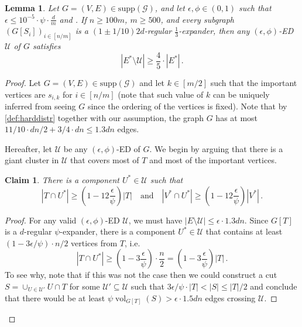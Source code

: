 \documentclass[epsfig,letter,11pt]{article}
\numberwithin{equation}{section}
\DeclareMathOperator{\vol}{vol}
\newcommand*{\supp}{\mathrm{supp}}
\newtheorem{lemma}[theorem]{Lemma}
\newtheorem{claim}[theorem]{Claim}
\begin{document}
\begin{lemma} \label{lem:special-edge}
	Let $G=(V,E) \in \supp(\mathcal{G})$, and let $\epsilon,\phi \in (0,1)$ such that $\epsilon \le 10^{-5} \cdot \psi \cdot \frac{d}{m}$ and . If $n \ge 100 m$, $m\ge 500$, and every subgraph $(G[S_i])_{i \in [n/m]}$ is a $(1 \pm 1/10)2d$-regular $\frac{1}{3}$-expander, then any $(\epsilon,\phi)$-ED~$\mathcal{U}$ of $G$ satisfies
	\begin{equation*}
		\left| E^* \setminus \mathcal{U}\right| \ge \frac{4}{5} \cdot \left| E^*\right| \, .
	\end{equation*}
\end{lemma}

\begin{proof} 
	Let $G=(V,E) \in \supp(\mathcal{G})$ and let $k \in [m/2]$ such that the important vertices are $s_{i,k}$ for $i \in [n/m]$ (note that such value of $k$ can be uniquely inferred from seeing $G$ since the ordering of the vertices is fixed). Note that by \cref{def:harddistr} together with our assumption, the graph $G$ has at most $11/10\cdot dn/2+3/4 \cdot dn \le 1.3 dn$ edges.
	
	Hereafter, let $\mathcal{U}$ be any $(\epsilon,\phi)$-ED of $G$. We begin by arguing that there is a giant cluster in $\mathcal{U}$ that covers most of $T$ and most of the important vertices.
	
	\begin{claim}
		\label{claim:giantcluster}
		There is a component $U^* \in \mathcal{U}$ such that
		\begin{equation*}
			|T \cap U^*| \ge\left(1-12\frac{\epsilon}{\psi}\right) |T| \quad \text{and} \quad |V^* \cap U^*| \ge  \left(1-12\frac{\epsilon}{\psi}\right) |V^*| \, .
		\end{equation*}
	\end{claim}
	\begin{proof}
		For any valid $(\epsilon,\phi)$-ED $\mathcal{U}$, we must have $|E \setminus \mathcal{U}| \le \epsilon \cdot 1.3 dn$. Since $G[T]$ is a $d$-regular $\psi$-expander, there is a component $U^* \in \mathcal{U}$ that contains at least $(1-3 \epsilon/\psi) \cdot n/2$ vertices from $T$, i.e.
		\begin{equation*}
		|T \cap U^* | \ge\left(1-3\frac{\epsilon}{\psi}\right)\cdot \frac{n}{2} = \left(1-3\frac{\epsilon}{\psi}\right)|T|   \, .
		\end{equation*}
		To see why, note that if this was not the case then we could construct a cut $S = \cup_{U \in \mathcal{U}'} U \cap T$ for some $\mathcal{U}' \subseteq \mathcal{U}$ such that $3\epsilon/\psi \cdot |T| < |S| \le |T|/2$ and conclude that there would be at least $ \psi \vol_{G[T]}(S) > \epsilon \cdot 1.5 dn$ edges crossing $\mathcal{U}$.
		

\end{proof}
\end{proof}
\end{document}
